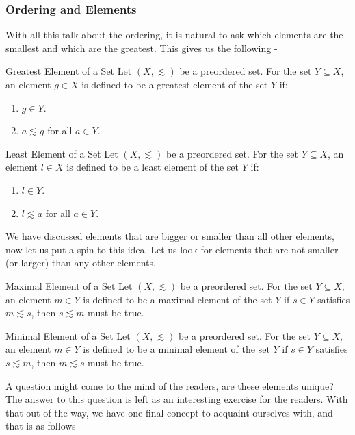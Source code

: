 \subsubsection{Ordering and Elements}
With all this talk about the ordering, it is natural to ask which elements are the smallest and which are the greatest. This gives us the following -
\begin{Definition}{Greatest Element of a Set}\label{greatest_element_of_a_set}
    Let $(X,\lesssim)$ be a preordered set. For the set $Y\subseteq X$, an element $g\in X$ is defined to be a greatest element of the set $Y$ if:
    \begin{enumerate}
        \item $g\in Y$.
        \item $a\lesssim g$ for all $a\in Y$.
    \end{enumerate}
\end{Definition}
\begin{Definition}{Least Element of a Set}\label{least_element_of_a_set}
    Let $(X,\lesssim)$ be a preordered set. For the set $Y\subseteq X$, an element $l\in X$ is defined to be a least element of the set $Y$ if:
    \begin{enumerate}
        \item $l\in Y$.
        \item $l\lesssim a$ for all $a\in Y$.
    \end{enumerate}
\end{Definition}
\noindent We have discussed elements that are bigger or smaller than all other elements, now let us put a spin to this idea. Let us look for elements that are not smaller (or larger) than any other elements.
\begin{Definition}{Maximal Element of a Set}\label{maximal_element_of_a_set}
    Let $(X,\lesssim)$ be a preordered set. For the set $Y\subseteq X$, an element $m\in Y$ is defined to be a maximal element of the set $Y$ if $s\in Y$ satisfies $m\lesssim s$, then $s\lesssim m$ must be true.
\end{Definition}
\begin{Definition}{Minimal Element of a Set}\label{minimal_element_of_a_set}
    Let $(X,\lesssim)$ be a preordered set. For the set $Y\subseteq X$, an element $m\in Y$ is defined to be a minimal element of the set $Y$ if $s\in Y$ satisfies $s\lesssim m$, then $m\lesssim s$ must be true.
\end{Definition}
\noindent A question might come to the mind of the readers, are these elements unique? The answer to this question is left as an interesting exercise for the readers. With that out of the way, we have one final concept to acquaint ourselves with, and that is as follows -
